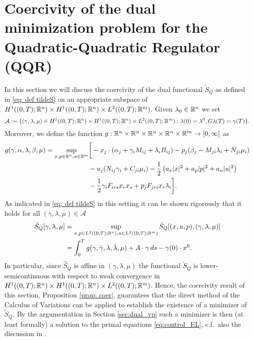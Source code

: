 \documentclass[11pt]{article}
\begin{document}
\section{Coercivity of the dual minimization problem for the Quadratic-Quadratic Regulator (QQR)}\label{sec:analysis}

In this section we will discuss the coercivity of the dual functional $\tilde{S}_Q$ as defined in \eqref{eq: def tildeS} on an appropriate subspace of $H^1((0,T); \mathbb R^n) \times H^1((0,T); \mathbb R^n) \times L^2((0,T); \mathbb R^m)$. 
Given $\lambda_0 \in \mathbb R^n$ we set
\[
\mathcal{A}:=\{(\gamma,\lambda,\mu) \in H^1((0,T); \mathbb R^n) \times H^1((0,T); \mathbb R^n) \times L^2((0,T); \mathbb R^m): \lambda(0) = \lambda^0, G \lambda(T) = \gamma(T)  \}.
\]
Moreover, we define the function $g: \mathbb R^n \times \mathbb R^n \times \mathbb R^n \times \mathbb R^n \times \mathbb R^m \to [0,\infty]$ as
\begin{align*}
g(\gamma,\alpha,\lambda,\beta,\mu) = \sup_{x,p \in\mathbb R^n, u \in \mathbb R^m} &\bigg[-x_j \cdot ( \alpha_j + \gamma_i M_{ij} + \lambda_i B_{ij} ) - p_j ( \beta_j -  M_{ji} \lambda_i + N_{ji} \mu_i ) \\ & - u_j ( N_{ij} \gamma_i + C_{ji} \mu_i)  - \frac12\left( a_x |x |^2 + a_p |p|^2 + a_u |u|^2 \right) \\ & - \frac12 \gamma_i F_{irs} x_r x_s + p_j F_{jri} x_r \lambda_i \bigg].
\end{align*}
As indicated in \eqref{eq: def tildeS} in this setting it can be shown rigorously that it holds for all $(\gamma,\lambda,\mu) \in \mathcal{A}$
\begin{align*}
\tilde{S}_Q[\gamma,\lambda,\mu] &= \sup_{x,p \in L^2((0,T);\mathbb R^n), u\in L^2((0,T);\mathbb R^m)} \hat{S}_Q[(x,u,p),(\gamma,\lambda,\mu)] \\ &=\int_0^T g(\gamma,\dot{\gamma},\lambda,\dot{\lambda},\mu) + A \cdot \gamma\, ds - \gamma(0)\cdot x^0. 
\end{align*}
In particular, since $\hat{S}_Q$ is affine in $(\gamma,\lambda,\mu)$ the functional $\tilde{S}_Q$ is lower-semicontinuous with respect to weak convergence in $H^1((0,T);\mathbb R^n) \times H^1((0,T);\mathbb R^n) \times L^2((0,T);\mathbb R^m)$.
Hence, the coercivity result of this section, Proposition \ref{prop: coer}, guarantees that the direct method of the Calculus of Variations can be applied to establish the existence of a minimizer of $\tilde{S}_Q$. By the argumentation in Section \ref{sec:dual_vp} such a minimizer is then (at least formally) a solution to the primal equations \eqref{eq:control_EL}, c.f.~also the discussion in \cite[Section 5]{sga}.
\end{document}

